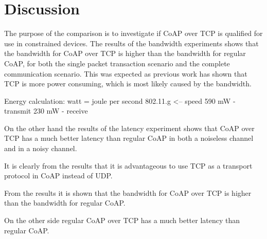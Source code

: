 \section{Discussion}
The purpose of the comparison is to investigate if CoAP over TCP is qualified for use in constrained devices. The results of the bandwidth experiments shows that the bandwidth for CoAP over TCP is higher than the bandwidth for regular CoAP, for both the single packet transaction scenario and the complete communication scenario. This was expected as previous work has shown that TCP is more power consuming, which is most likely caused by the bandwidth.

Energy calculation:
watt = joule per second
802.11.g <-- speed 
590 mW - transmit
230 mW - receive


On the other hand the results of the latency experiment shows that CoAP over TCP has a much better latency than regular CoAP in both a noiseless channel and in a noisy channel. 

It is clearly from the results that it is advantageous to use TCP as a transport protocol in CoAP instead of UDP.

From the results it is shown that the bandwidth for CoAP over TCP is higher than the bandwidth for regular CoAP.

On the other side regular CoAP over TCP has a much better latency than regular CoAP.

	



